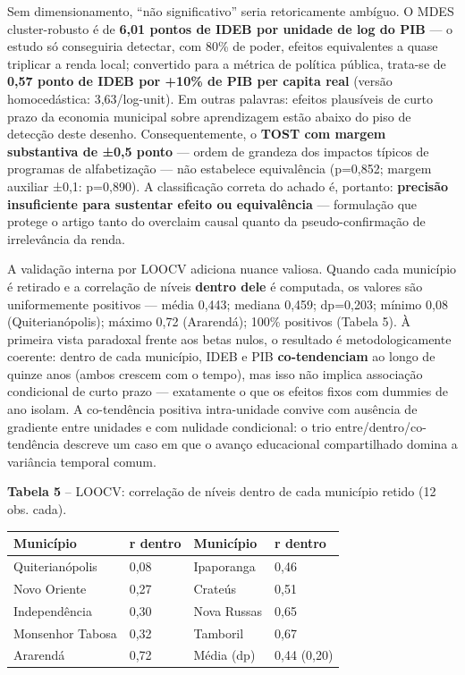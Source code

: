 \documentclass[
  brazilian,
  12pt,
  a4paper,
]{article}
\begin{document}
Sem dimensionamento, ``não significativo'' seria retoricamente ambíguo.
O MDES cluster-robusto é de \textbf{6,01 pontos de IDEB por unidade de
log do PIB} --- o estudo só conseguiria detectar, com 80\% de poder,
efeitos equivalentes a quase triplicar a renda local; convertido para a
métrica de política pública, trata-se de \textbf{0,57 ponto de IDEB por
+10\% de PIB per capita real} (versão homocedástica: 3,63/log-unit). Em
outras palavras: efeitos plausíveis de curto prazo da economia municipal
sobre aprendizagem estão abaixo do piso de detecção deste desenho.
Consequentemente, o \textbf{TOST com margem substantiva de ±0,5 ponto}
--- ordem de grandeza dos impactos típicos de programas de alfabetização
--- não estabelece equivalência (p=0,852; margem auxiliar ±0,1:
p=0,890). A classificação correta do achado é, portanto:
\textbf{precisão insuficiente para sustentar efeito ou equivalência} ---
formulação que protege o artigo tanto do overclaim causal quanto da
pseudo-confirmação de irrelevância da renda.

A validação interna por LOOCV adiciona nuance valiosa. Quando cada
município é retirado e a correlação de níveis \textbf{dentro dele} é
computada, os valores são uniformemente positivos --- média 0,443;
mediana 0,459; dp=0,203; mínimo 0,08 (Quiterianópolis); máximo 0,72
(Ararendá); 100\% positivos (Tabela 5). À primeira vista paradoxal
frente aos betas nulos, o resultado é metodologicamente coerente: dentro
de cada município, IDEB e PIB \textbf{co-tendenciam} ao longo de quinze
anos (ambos crescem com o tempo), mas isso não implica associação
condicional de curto prazo --- exatamente o que os efeitos fixos com
dummies de ano isolam. A co-tendência positiva intra-unidade convive com
ausência de gradiente entre unidades e com nulidade condicional: o trio
entre/dentro/co-tendência descreve um caso em que o avanço educacional
compartilhado domina a variância temporal comum.

\textbf{Tabela 5} -- LOOCV: correlação de níveis dentro de cada
município retido (12 obs. cada).

\begin{longtable}[]{@{}llll@{}}
\toprule\noalign{}
Município & r dentro & Município & r dentro \\
\midrule\noalign{}
\endhead
\bottomrule\noalign{}
\endlastfoot
Quiterianópolis & 0,08 & Ipaporanga & 0,46 \\
Novo Oriente & 0,27 & Crateús & 0,51 \\
Independência & 0,30 & Nova Russas & 0,65 \\
Monsenhor Tabosa & 0,32 & Tamboril & 0,67 \\
Ararendá & 0,72 & Média (dp) & 0,44 (0,20) \\
\end{longtable}
\end{document}
